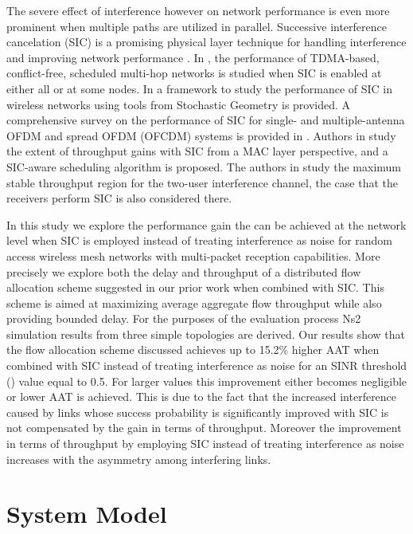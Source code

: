 \documentclass[conference]{IEEEtran}
\begin{document}
The severe effect of interference however on network performance is even more prominent when multiple paths are utilized in parallel.
Successive interference cancelation (SIC) is a promising physical layer technique for handling interference
and improving network performance \cite{4276942,Verdu:1998:MD:521411, 1210740, 5937210, 6339119}.
In \cite{5960833}, the performance of TDMA-based, conflict-free, scheduled multi-hop networks is studied when SIC is enabled at either all or at some nodes.
In \cite{b:TITHaenggi} a framework to study the performance of SIC in wireless networks using tools from Stochastic Geometry is provided.
A comprehensive survey on the performance of SIC for single- and multiple-antenna OFDM and spread OFDM (OFCDM) systems is provided in \cite{ b:SICSurvey}.
Authors in \cite{ b:TMC13} study the extent of throughput gains with SIC from a MAC layer perspective, and a SIC-aware scheduling algorithm is proposed.
The authors in \cite{b:PappasITW13} study the maximum stable throughput region for the two-user interference channel,
the case that the receivers perform SIC is also considered there.

In this study we explore the performance gain the can be achieved at the network level when SIC is employed
instead of treating interference as noise for random access wireless mesh networks with multi-packet reception
capabilities. More precisely we explore both the delay and  throughput
of a distributed flow allocation scheme suggested in our prior work \cite{6824997, DBLP:journals/corr/PloumidisPT14}
when combined with SIC. This scheme is aimed at maximizing average aggregate flow throughput
while also providing bounded delay. For the purposes of the evaluation process Ns2 simulation results from three simple topologies are derived.
Our results show that the flow allocation scheme discussed achieves up to 15.2\% higher AAT when combined with SIC instead of treating interference as noise
for an SINR threshold () value equal to 0.5. For larger  values this improvement either becomes negligible or lower AAT
is achieved. This is due to the fact that the increased interference caused by links whose success probability is significantly
improved with SIC is not compensated by the gain in terms of throughput. Moreover the improvement in terms of throughput by employing SIC instead
of treating interference as noise increases with the asymmetry among interfering links.

\section{System Model}
\label{sec:system_model}
\end{document}
